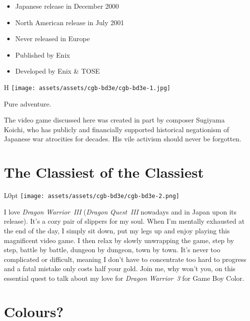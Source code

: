 \documentclass{book}
\begin{document}
\begin{itemize} \setlength\itemsep{-0.4em}
\item Japanese release in December 2000
\item North American release in July 2001
\item Never released in Europe
\item Published by Enix
\item Developed by Enix \& TOSE
\end{itemize}\noindent

\begin{wrapfigure}{H}{\linewidth}
\vskip 4pt
\centering \texttt{[image: assets/assets/cgb-bd3e/cgb-bd3e-1.jpg]}\par\pagetwodescription Pure adventure.\end{wrapfigure}
\clearpage

The video game discussed here was created in part by composer Sugiyama Koichi, who has publicly and financially supported historical negationism of Japanese war atrocities for decades. His vile activism should never be forgotten.

\FloatBarrier\needspace{10mm}\section*{The Classiest of the Classiest}\nopagebreak[4]

\begin{wrapfigure}{L}{0pt} \texttt{[image: assets/assets/cgb-bd3e/cgb-bd3e-2.png]}\end{wrapfigure}
I love \emph{Dragon Warrior III} (\emph{Dragon Quest III} nowadays and in Japan upon its release). It’s a cozy pair of slippers for my soul. When I’m mentally exhausted at the end of the day, I simply sit down, put my legs up and enjoy playing this magnificent video game. I then relax by slowly unwrapping the game, step by step, battle by battle, dungeon by dungeon, town by town. It’s never too complicated or difficult, meaning I don’t have to concentrate too hard to progress and a fatal mistake only costs half your gold. Join me, why won’t you, on this essential quest to talk about my love for \emph{Dragon Warrior 3} for Game Boy Color.

\FloatBarrier\needspace{10mm}\section*{Colours?}\nopagebreak[4]
\end{document}
